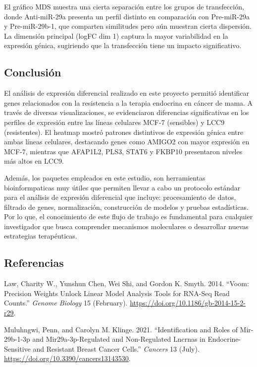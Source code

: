 \documentclass[
]{article}
\newlength{\cslhangindent}
\newenvironment{CSLReferences}[2] %
 {\begin{list}{}{%
  \setlength{\itemindent}{0pt}
  \setlength{\leftmargin}{0pt}
  \setlength{\parsep}{0pt}
  \ifodd #1
   \setlength{\leftmargin}{\cslhangindent}
   \setlength{\itemindent}{-1\cslhangindent}
  \fi
  \setlength{\itemsep}{#2\baselineskip}}}
 {\end{list}}
\begin{document}
El gráfico MDS muestra una cierta separación entre los grupos de
transfección, donde Anti-miR-29a presenta un perfil distinto en
comparación con Pre-miR-29a y Pre-miR-29b-1, que comparten similitudes
pero aún muestran cierta dispersión. La dimensión principal (logFC dim
1) captura la mayor variabilidad en la expresión génica, sugiriendo que
la transfección tiene un impacto significativo.

\subsection{Conclusión}\label{conclusiuxf3n}

El análisis de expresión diferencial realizado en este proyecto permitió
identificar genes relacionados con la resistencia a la terapia endocrina
en cáncer de mama. A través de diversas visualizaciones, se evidenciaron
diferencias significativas en los perfiles de expresión entre las líneas
celulares MCF-7 (sensibles) y LCC9 (resistentes). El heatmap mostró
patrones distintivos de expresión génica entre ambas líneas celulares,
destacando genes como AMIGO2 con mayor expresión en MCF-7, mientras que
AFAP1L2, PLS3, STAT6 y FKBP10 presentaron niveles más altos en LCC9.

Además, los paquetes empleados en este estudio, son herramientas
bioinformpaticas muy útiles que permiten llevar a cabo un protocolo
estándar para el análisis de expresión diferencial que incluye:
procesamiento de datos, filtrado de genes, normalización, construcción
de modelos y pruebas estadísticas. Por lo que, el conocimiento de este
flujo de trabajo es fundamental para cualquier investigador que busca
comprender mecanismos moleculares o desarrollar nuevas estrategias
terapéuticas.

\subsection*{Referencias}\label{referencias}

\label{refs}
\begin{CSLReferences}{1}{0}
Law, Charity W., Yunshun Chen, Wei Shi, and Gordon K. Smyth. 2014.
{``Voom: Precision Weights Unlock Linear Model Analysis Tools for
RNA-Seq Read Counts.''} \emph{Genome Biology} 15 (February).
\url{https://doi.org/10.1186/gb-2014-15-2-r29}.

Muluhngwi, Penn, and Carolyn M. Klinge. 2021. {``Identification and
Roles of Mir-29b-1-3p and Mir29a-3p-Regulated and Non-Regulated Lncrnas
in Endocrine-Sensitive and Resistant Breast Cancer Cells.''}
\emph{Cancers} 13 (July). \url{https://doi.org/10.3390/cancers13143530}.

\end{CSLReferences}
\end{document}

